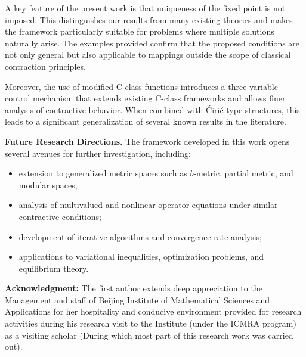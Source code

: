 \documentclass[11pt,reqno]{amsart}
\theoremstyle{definition}
\theoremstyle{remark}
\numberwithin{equation}{section}
\begin{document}
	A key feature of the present work is that uniqueness of the fixed point is not imposed. This distinguishes our results from many existing theories and makes the framework particularly suitable for problems where multiple solutions naturally arise. The examples provided confirm that the proposed conditions are not only general but also applicable to mappings outside the scope of classical contraction principles.
	
	Moreover, the use of modified C-class functions introduces a three-variable control mechanism that extends existing C-class frameworks and allows finer analysis of contractive behavior. When combined with Ćirić-type structures, this leads to a significant generalization of several known results in the literature.
	
	\medskip
	
	\noindent
	\textbf{Future Research Directions.} The framework developed in this work opens several avenues for further investigation, including:
	\begin{itemize}
		\item extension to generalized metric spaces such as $b$-metric, partial metric, and modular spaces;
		\item analysis of multivalued and nonlinear operator equations under similar contractive conditions;
		\item development of iterative algorithms and convergence rate analysis;
		\item applications to variational inequalities, optimization problems, and equilibrium theory.
	\end{itemize}
	
	\medskip
	
	\noindent
	\textbf{Acknowledgment:} The first author extends deep appreciation to the Management and staff of Beijing Institute of Mathematical Sciences and Applications for her hospitality and conducive environment provided for research activities during his research visit to the Institute (under the ICMRA program) as a visiting scholar (During which most part of this research work was carried out). 	
	
	
	
\end{document}
